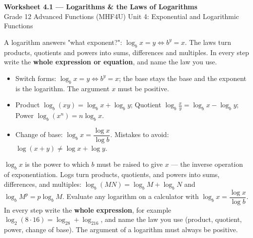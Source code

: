 \documentclass[11pt]{article}
\begin{document}
\begin{center}
{\LARGE\bfseries\color{titleblue}Worksheet 4.1 --- Logarithms \& the Laws of Logarithms}\\[2pt]
{\small Grade 12 Advanced Functions (MHF4U) \textperiodcentered{} Unit 4: Exponential and Logarithmic Functions}
\end{center}

\begin{ideabox}
A logarithm answers "what exponent?": $\log_b x=y\iff b^y=x$. The laws turn products, quotients and powers into sums, differences and multiples. In every step write the \textbf{whole expression or equation}, and name the law you use.
\begin{itemize}[leftmargin=*,itemsep=2pt]
  \item Switch forms: $\log_b x=y\iff b^y=x$; the base stays the base and the exponent is the logarithm. The argument $x$ must be positive.
  \item Product $\log_b(xy)=\log_b x+\log_b y$; Quotient $\log_b\frac{x}{y}=\log_b x-\log_b y$; Power $\log_b(x^n)=n\log_b x$.
  \item Change of base: $\log_b x=\dfrac{\log x}{\log b}$. Mistakes to avoid: $\log(x+y)\ne\log x+\log y$.
\end{itemize}
\end{ideabox}

\begin{learnbox}
$\log_b x$ is the power to which $b$ must be raised to give $x$ — the inverse operation of exponentiation.
Logs turn products, quotients, and powers into sums, differences, and multiples: $\log_b(MN)=\log_b M+\log_b N$ and $\log_b M^p=p\log_b M$.
Evaluate any logarithm on a calculator with $\log_b x=\dfrac{\log x}{\log b}$.
In every step write the \textbf{whole expression}, for example $\log_2(8\cdot16)=\log_28+\log_216$, and name the law you use (product, quotient, power, change of base). The argument of a logarithm must always be positive.
\end{learnbox}

\end{document}

